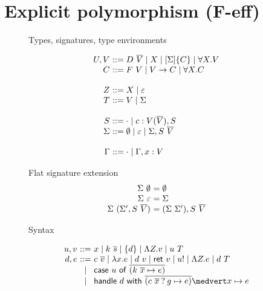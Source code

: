 \documentclass[preprint]{sigplanconf}
\newcommand{\many}{\overline}
\newcommand{\sig}{S}
\newcommand{\sigs}{\Sigma}
\newcommand{\effbox}[1]{[#1]}
\newcommand{\keyword}[1]{\mathsf{#1}}
\newcommand{\handleSymbol}{\mathbin{?}}
\newcommand{\handle}[2]{{#1} \handleSymbol {#2}}
\newcommand{\thunk}[1]{\{{#1}\}}
\newcommand{\force}[1]{{#1}!}
\begin{document}
\section{Explicit polymorphism (F-eff)}

\begin{figure*}

Types, signatures, type environments

\[
\begin{array}{@{}r@{~}l@{}}
U, V &::= D~\many{V} \mid X \mid \effbox{\sigs}\thunk{C} \mid \forall X.V \\
C    &::= F~V \mid V \to C \mid \forall X.C \\
\\
Z    &::= X \mid \varepsilon \\
T    &::= V \mid \sigs \\
\\
\sig  &::= \cdot \mid c : V(\many{V}), \sig \\
\sigs &::=
  \emptyset \mid \varepsilon \mid \sigs, \sig~\many{V} \\
\\
\Gamma &::= \cdot \mid \Gamma, x:V \\
\end{array}
\]

Flat signature extension
\[
\begin{array}{@{}r@{~}l@{}}
\sigs~\emptyset &= \emptyset \\
\sigs~\varepsilon &= \sigs \\
\sigs~(\sigs', \sig~\many{V}) &= (\sigs~\sigs'), \sig~\many{V} \\
\end{array}
\]

Syntax

\[
\begin{array}{@{}r@{~}c@{~}l@{}}
u, v &::=& x \mid k~\many{s} \mid \thunk{d}  %
             \mid \Lambda Z.v \mid u~T \\
d, e &::=& c~\many{v}                        %
   \mid \lambda x.e \mid d~v \mid \keyword{ret}~v \mid \force{u}
   \mid \Lambda Z.e \mid d~T \\
  &\mid& \keyword{case}~u~\keyword{of}~
           \many{(k~\many{x} \mapsto e)} \\
  &\mid& \keyword{handle} ~d~ \keyword{with}~
           \many{(\handle{c~\many{x}}{g} \mapsto e)} \medvert
            x        \mapsto e \\
\end{array}
\]


\end{figure*}
\end{document}
